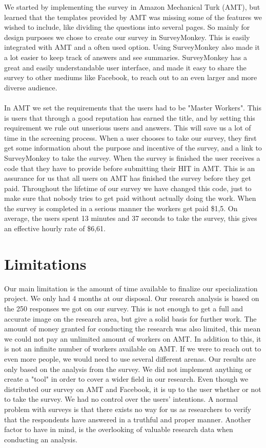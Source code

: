 We started by implementing the survey in Amazon Mechanical Turk (AMT), but learned that the templates provided by AMT was missing some of the features we wished to include, like dividing the questions into several pages. So mainly for design purposes we chose to create our survey in SurveyMonkey. This is easily integrated with AMT and a often used option.  Using SurveyMonkey also made it a lot easier to keep track of answers and see summaries. SurveyMonkey has a great and easily understandable user interface, and made it easy to share the survey to other mediums like Facebook, to reach out to an even larger and more diverse audience. 

\paragraph{}
In AMT we set the requirements that the users had to be "Master Workers". This is users that through a good reputation has earned the title, and by setting this requirement we rule out unserious users and answers. This will save us a lot of time in the screening process. When a user chooses to take our survey, they first get some information about the purpose and incentive of the survey, and a link to SurveyMonkey to take the survey. When the survey is finished the user receives a code that they have to provide before submitting their HIT in AMT. This is an assurance for us that all users on AMT has finished the survey before they get paid. Throughout the lifetime of our survey we have changed this code, just to make sure that nobody tries to get paid without actually doing the work. When the survey is completed in a serious manner the workers get paid \$1,5. On average, the users spent 13 minutes and 37 seconds to take the survey, this gives an effective hourly rate of \$6,61.    

\section{Limitations} 
Our main limitation is the amount of time available to finalize our specialization project. We only had 4 months at our disposal. Our research analysis is based on the 250 responses we got on our survey. This is not enough to get a full and accurate image on the research area, but give a solid basis for further work. The amount of money granted for conducting the research was also limited, this mean we could not pay an unlimited amount of workers on AMT. In addition to this, it is not an infinite number of workers available on AMT. If we were to reach out to even more people, we would need to use several different arenas. Our results are only based on the analysis from the survey. We did not implement anything or create a "tool" in order to cover a wider field in our research. Even though we distributed our survey on AMT and Facebook, it is up to the user whether or not to take the survey. We had no control over the users' intentions. A normal problem with surveys is that there exists no way for us as researchers to verify that the respondents have answered in a truthful and proper manner. Another factor to have in mind, is the overlooking of valuable research data when conducting an analysis. 


